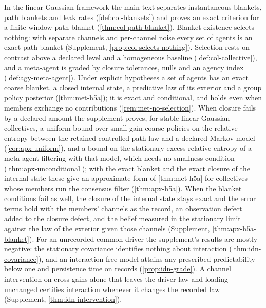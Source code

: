 In the linear-Gaussian framework the main text separates instantaneous blankets, path blankets and leak rates (\cref{def:col-blankets}) and proves an exact criterion for a finite-window path blanket (\cref{thm:col-path-blanket}). Blanket existence selects nothing: with separate channels and per-channel noise every set of agents is an exact path blanket (Supplement, \cref{prop:col-selects-nothing}). Selection rests on contrast above a declared level and a homogeneous baseline (\cref{def:col-collective}), and a meta-agent is graded by closure tolerances, nulls and an agency index (\cref{def:agy-meta-agent}). Under explicit hypotheses a set of agents has an exact coarse blanket, a closed internal state, a predictive law of its exterior and a group policy posterior (\cref{thm:met-h5a}); it is exact and conditional, and holds even when members exchange no contributions (\cref{rem:met-no-selection}). When closure fails by a declared amount the supplement proves, for stable linear-Gaussian collectives, a uniform bound over small-gain coarse policies on the relative entropy between the retained controlled path law and a declared Markov model (\cref{cor:apx-uniform}), and a bound on the stationary excess relative entropy of a meta-agent filtering with that model, which needs no smallness condition (\cref{thm:apx-unconditional}); with the exact blanket and the exact closure of the internal state these give an approximate form of \cref{thm:met-h5a} for collectives whose members run the consensus filter (\cref{thm:apx-h5a}). When the blanket conditions fail as well, the closure of the internal state stays exact and the error terms hold with the members' channels as the record, an observation defect added to the closure defect, and the belief measured in the stationary limit against the law of the exterior given those channels (Supplement, \cref{thm:apx-h5a-blanket}). For an unrecorded common driver the supplement's results are mostly negative: the stationary covariance identifies nothing about interaction (\cref{thm:idn-covariance}), and an interaction-free model attains any prescribed predictability below one and persistence time on records (\cref{prop:idn-grade}). A channel intervention on cross gains alone that leaves the driver law and loading unchanged certifies interaction whenever it changes the recorded law (Supplement, \cref{thm:idn-intervention}).

